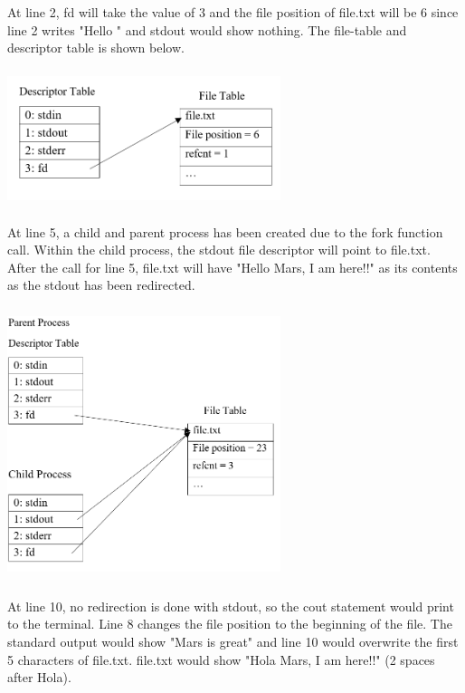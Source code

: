 \documentclass[12pt]{article}
\begin{document}
At line 2, fd will take the value of 3 and the file position of file.txt will be 6 since line 2 writes "Hello " and stdout would show nothing. The file-table and descriptor table is shown below. 

\begin{center}
\includegraphics[width=8cm, height=4cm]{P6Line2}
\end{center}

At line 5, a child and parent process has been created due to the fork function call. Within the child process, the stdout file descriptor will point to file.txt. After the call for line 5, file.txt will have "Hello Mars, I am here!!" as its contents as the stdout has been redirected. 

\begin{center}
\includegraphics[width=8cm, height=8cm]{P6Line5}
\end{center}

At line 10, no redirection is done with stdout, so the cout statement would print to the terminal. Line 8 changes the file position to the beginning of the file. The standard output would show "Mars is great" and line 10 would overwrite the first 5 characters of file.txt. file.txt would show "Hola  Mars, I am here!!" (2 spaces after Hola). 
\end{document}
